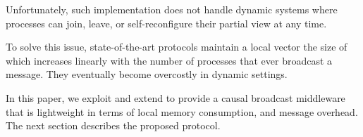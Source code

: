 Unfortunately, such implementation does not handle dynamic systems where
processes can join, leave, or self-reconfigure their partial view at any
time.  

To solve this issue, state-of-the-art protocols maintain a local vector the size
of which increases linearly with the number of processes that ever broadcast a
message. They eventually become overcostly in dynamic settings.

In this paper, we exploit and extend \PCBROADCAST to provide a causal broadcast
middleware that is lightweight in terms of local memory consumption, and message
overhead. The next section describes the proposed protocol.

